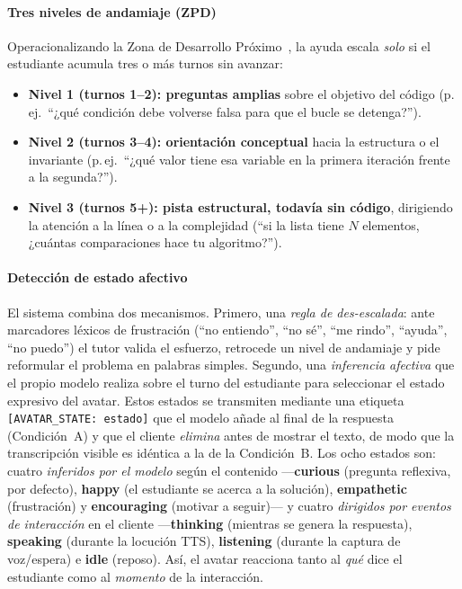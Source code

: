 \documentclass[conference]{IEEEtran}
\begin{document}
\paragraph{Tres niveles de andamiaje (ZPD)} Operacionalizando la Zona de Desarrollo
Pr\'oximo~\cite{vygotsky1978mind}, la ayuda escala \emph{solo} si el estudiante acumula tres o m\'as
turnos sin avanzar:
\begin{itemize}
  \item \textbf{Nivel 1 (turnos 1--2): preguntas amplias} sobre el objetivo del c\'odigo
        (p.\,ej.\ ``¿qu\'e condici\'on debe volverse falsa para que el bucle se detenga?'').
  \item \textbf{Nivel 2 (turnos 3--4): orientaci\'on conceptual} hacia la estructura o el invariante
        (p.\,ej.\ ``¿qu\'e valor tiene esa variable en la primera iteraci\'on frente a la
        segunda?'').
  \item \textbf{Nivel 3 (turnos 5+): pista estructural, todav\'ia sin c\'odigo}, dirigiendo la
        atenci\'on a la l\'inea o a la complejidad (``si la lista tiene $N$ elementos, ¿cu\'antas
        comparaciones hace tu algoritmo?'').
\end{itemize}

\paragraph{Detecci\'on de estado afectivo} El sistema combina dos mecanismos. Primero, una
\emph{regla de des-escalada}: ante marcadores l\'exicos de frustraci\'on (``no entiendo'', ``no
s\'e'', ``me rindo'', ``ayuda'', ``no puedo'') el tutor valida el esfuerzo, retrocede un nivel de
andamiaje y pide reformular el problema en palabras simples. Segundo, una \emph{inferencia
afectiva} que el propio modelo realiza sobre el turno del estudiante para seleccionar el estado
expresivo del avatar. Estos estados se transmiten mediante una etiqueta
\texttt{[AVATAR\_STATE:\,estado]} que el modelo a\~nade al final de la respuesta (Condici\'on~A) y
que el cliente \emph{elimina} antes de mostrar el texto, de modo que la transcripci\'on visible es
id\'entica a la de la Condici\'on~B. Los ocho estados son: cuatro \emph{inferidos por el modelo}
seg\'un el contenido ---\textbf{curious} (pregunta reflexiva, por defecto), \textbf{happy}
(el estudiante se acerca a la soluci\'on), \textbf{empathetic} (frustraci\'on) y
\textbf{encouraging} (motivar a seguir)--- y cuatro \emph{dirigidos por eventos de interacci\'on}
en el cliente ---\textbf{thinking} (mientras se genera la respuesta), \textbf{speaking} (durante la
locuci\'on TTS), \textbf{listening} (durante la captura de voz/espera) e \textbf{idle} (reposo).
As\'i, el avatar reacciona tanto al \emph{qu\'e} dice el estudiante como al \emph{momento} de la
interacci\'on.
\end{document}

